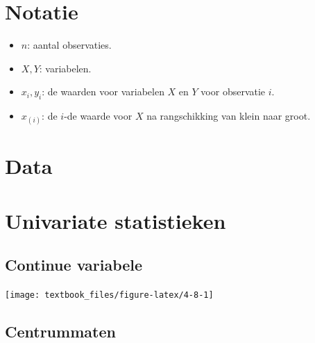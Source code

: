\documentclass[]{tufte-book}
\providecommand{\tightlist}{%
  \setlength{\itemsep}{0pt}\setlength{\parskip}{0pt}}
\begin{document}
\hypertarget{notatie}{%
\section{Notatie}\label{notatie}}

\begin{itemize}
\tightlist
\item
  \(n\): aantal observaties.
\item
  \(X, Y\): variabelen.
\item
  \(x_i, y_i\): de waarden voor variabelen \(X\) en \(Y\) voor observatie \(i\).
\item
  \(x_{(i)}\): de \(i\)-de waarde voor \(X\) na rangschikking van klein naar groot.
\end{itemize}

\hypertarget{data}{%
\section{Data}\label{data}}

\hypertarget{univariate-statistieken}{%
\section{Univariate statistieken}\label{univariate-statistieken}}

\hypertarget{continue-variabele-1}{%
\subsection{Continue variabele}\label{continue-variabele-1}}

\texttt{[image: textbook\_files/figure-latex/4-8-1]}

\hypertarget{centrummaten}{%
\subsection*{Centrummaten}\label{centrummaten}}
\end{document}
